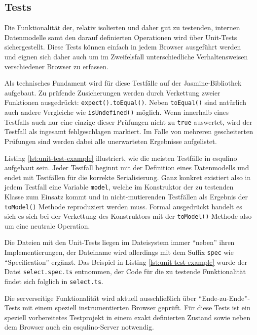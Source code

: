 \subsection{Tests}

Die Funktionalität der, relativ isolierten und daher gut zu testenden, internen Datenmodelle samt den darauf definierten Operationen wird über Unit-Tests sichergestellt. Diese Tests können einfach in jedem Browser ausgeführt werden und eignen sich daher auch um im Zweifelsfall unterschiedliche Verhaltensweisen verschiedener Browser zu erfassen.

Als technisches Fundament wird für diese Testfälle auf der Jasmine-Bibliothek aufgebaut. Zu prüfende Zusicherungen werden durch Verkettung zweier Funktionen ausgedrückt: \lstinline{expect().toEqual()}. Neben \lstinline{toEqual()} sind natürlich auch andere Vergleiche wie \lstinline{isUndefined()} möglich. Wenn innerhalb eines Testfalls auch nur eine einzige dieser Prüfungen nicht zu \lstinline{true} auswertet, wird der Testfall als ingesamt fehlgeschlagen markiert. Im Falle von mehreren gescheiterten Prüfungen sind werden dabei alle unerwarteten Ergebnisse aufgelistet.

Listing \ref{lst:unit-test-example} illustriert, wie die meisten Testfälle in esqulino aufgebaut sein. Jeder Testfall beginnt mit der Definition eines Datenmodells und endet mit Testfällen für die korrekte Serialisierung. Ganz konkret existiert also in jedem Testfall eine Variable \lstinline{model}, welche im Konstruktor der zu testenden Klasse zum Einsatz kommt und in nicht-mutierenden Testfällen als Ergebnis der \lstinline{toModel()} Methode reproduziert werden muss. Formal ausgedrückt handelt es sich es sich bei der Verkettung des Konstruktors mit der \lstinline{toModel()}-Methode also um eine neutrale Operation.

Die Dateien mit den Unit-Tests liegen im Dateisystem immer "`neben"' ihren Implementierungen, der Dateiname wird allerdings mit dem Suffix \lstinline{spec} wie "`Specification"' ergänzt. Das Beispiel in Listing  \ref{lst:unit-test-example} wurde der Datei \lstinline{select.spec.ts} entnommen, der Code für die zu testende Funktionalität findet sich folglich in \lstinline{select.ts}.



Die serverseitige Funktionalität wird aktuell ausschließlich über "`Ende-zu-Ende"'-Tests mit einem speziell instrumentierten Browser geprüft. Für diese Tests ist ein speziell vorbereitetes Testprojekt in einem exakt definierten Zustand sowie neben dem Browser auch ein esqulino-Server notwendig.

